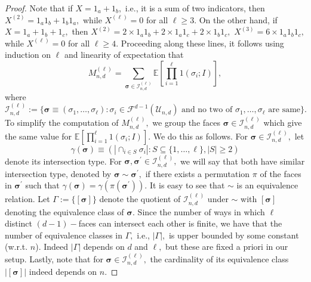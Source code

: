 \documentclass[12pt]{amsart}
\newcommand{\dy}[1]{\textcolor{magenta}{#1}}
\newcommand{\gt}[1]{\textcolor{blue}{#1}}
\renewcommand{\dy}[1]{#1}
\renewcommand{\gt}[1]{#1}
\numberwithin{equation}{section}
\numberwithin{theorem}{section}
\newcommand{\1}{\mathbf{1}}
\def\F{\mathcal{F}}
\def\U{\mathcal{U}}
\def\sI{\mathscr{I}}
\begin{document}
\begin{proof}
\gt{Note that if $X = 1_a + 1_b,$ i.e., it is a sum of two indicators, then $X^{(2)} = 1_a 1_b + 1_b 1_a,$ while $X^{(\ell)} = 0$ for all $\ell \geq 3.$ On the other hand, if $X = 1_a + 1_b + 1_c,$ then $X^{(2)} = 2\times 1_a1_b + 2 \times 1_a1_c + 2 \times 1_b 1_c,$  $X^{(3)} = 6 \times 1_a 1_b 1_c,$ while $X^{(\ell)} = 0$ for all $\ell \geq 4.$} Proceeding along these lines, it follows using induction on $\ell$ \dy{and linearity of expectation} that 
%		
\[
M_{n, d}^{(\ell)} = \sum_{\pmb{\sigma} \in \sI_{n, d}^{(\ell)}} \mathbb{E}\left[\prod_{i = 1}^{\ell} 1(\sigma_i; I) \right],
\]
%
where
%
\[
\sI_{n, d}^{(\ell)} :=  \{\pmb{\sigma} \equiv (\sigma_1, \ldots, \sigma_{\ell}) : \sigma_i \in \F^{d - 1}(\U_{n, d}) \text{ and
no two of } \sigma_1, \ldots, \sigma_\ell \text{ are same}\}.
\]
%
To simplify the computation of $M_{n, d}^{(\ell)},$ we group the faces $\pmb{\sigma} \in \sI_{n, d}^{(\ell)}$ which give the same value for $\mathbb{E}\left[\prod_{i = 1}^{\ell} 1(\sigma_i; I)\right].$ We do this as follows. For $\pmb{\sigma} \in \sI_{n, d}^{(\ell)},$ let
%
\[
\gamma(\pmb{\sigma}) \equiv (|\cap_{i \in S}\sigma_i|: S \subseteq
\{1, \ldots, \ell\},|S| \geq 2)
\]
%
denote its intersection type. For $\pmb{\sigma}, \pmb{\sigma^\prime} \in \sI_{n,
d}^{(\ell)},$ we will say that both have similar intersection type, denoted by $\pmb{\sigma} \sim
\pmb{\sigma^\prime},$ if there exists a permutation $\pi$ of the faces in $\pmb{\sigma^\prime}$ such that
$\gamma(\pmb{\sigma}) = \gamma(\pi(\pmb{\sigma^\prime})).$ It is easy to see that $\sim$ is an equivalence
relation. Let $\Gamma := \{[\pmb{\sigma}]\}$ denote the  quotient of $\sI_{n, d}^{(\ell)}$ under $\sim$ with
$[\pmb{\sigma}]$ denoting the equivalence class of $\pmb{\sigma}.$ Since the number of ways in which $\ell$ distinct $(d - 1)-$faces can intersect each other is finite, we have that the number of equivalence classes in $\Gamma,$ i.e., $|\Gamma|,$ is upper bounded by some constant (w.r.t. $n$). Indeed $|\Gamma|$ depends on $d$ and $\ell,$ but these are fixed a priori in our setup. Lastly, note that for $\pmb{\sigma} \in \sI_{n, d}^{(\ell)},$ the cardinality of its equivalence class $|[\pmb{\sigma}]|$ indeed
depends on $n.$


\end{proof}
\end{document}
